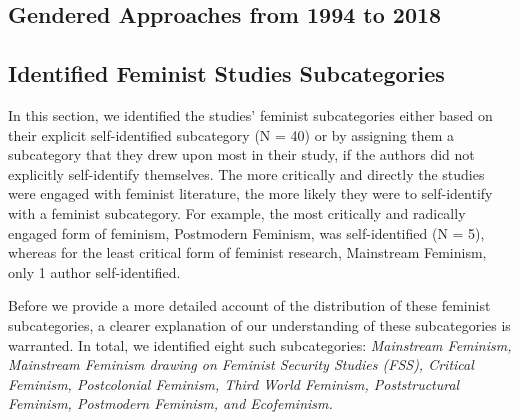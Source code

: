 \documentclass[10pt,a4paper]{article}
\begin{document}
\begin{multicols}{2}


\section{Gendered Approaches from 1994 to 2018}

\subsection{Identified Feminist Studies Subcategories}

\noindent In this section, we identified the studies' feminist subcategories either based on their explicit self-identified subcategory (N = 40) or by assigning them a subcategory that they drew upon most in their study, if the authors did not explicitly self-identify themselves. The more critically and directly the studies were engaged with feminist literature, the more likely they were to self-identify with a feminist subcategory. For example, the most critically and radically engaged form of feminism, Postmodern Feminism, was self-identified (N = 5), whereas for the least critical form of feminist research, Mainstream Feminism, only 1 author self-identified. 

Before we provide a more detailed account of the distribution of these feminist subcategories, a clearer explanation of our understanding of these subcategories is warranted. In total, we identified eight such subcategories: \textit{Mainstream Feminism, Mainstream Feminism drawing on Feminist Security Studies (FSS), Critical Feminism, Postcolonial Feminism, Third World Feminism, Poststructural Feminism, Postmodern Feminism, and Ecofeminism.}


\end{multicols}
\end{document}
